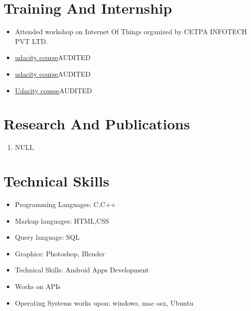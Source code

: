 \documentclass{article}
\begin{document}
\section{Training And Internship}
\begin{itemize}
\item {Attended workshop on Internet Of Things organized by CETPA INFOTECH PVT LTD.}
\item \href{https://classroom.udacity.com/courses/ud836}{udacity course}{AUDITED}
\item \href{https://classroom.udacity.com/courses/ud839}{udacity course}{AUDITED}
\item \href{https://classroom.udacity.com/courses/ud834}{Udacity cousse}{AUDITED}
\end{itemize}
\section{Research And Publications}
\begin{enumerate}
\item {NULL}
\end{enumerate}
\section{Technical Skills}
\begin{itemize}
\item {Programming Languages: C,C++}
\item {Markup languages: HTML,CSS}
\item {Query language: SQL}
\item {Graphics: Photoshop, Blender}
\item {Technical Skills: Android Apps Development}
\item {Works on APIs}
\item {Operating Systems works upon: windows, mac osx, Ubuntu}
\end{itemize}
\end{document}
